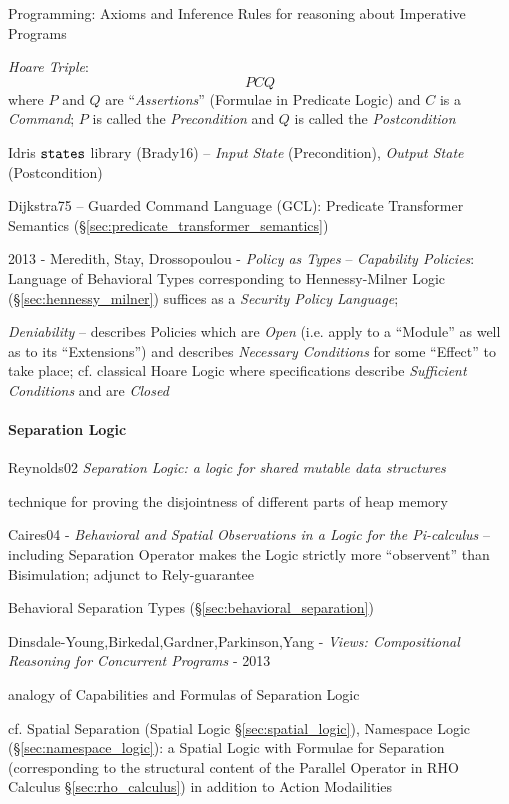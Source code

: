 Programming: Axioms and Inference Rules for reasoning about Imperative
Programs

\emph{Hoare Triple}:
\[
  {P} C {Q}
\]
where $P$ and $Q$ are ``\emph{Assertions}'' (Formulae in Predicate
Logic) and $C$ is a \emph{Command}; $P$ is called the
\emph{Precondition} and $Q$ is called the \emph{Postcondition}

Idris $\mathtt{states}$ library (Brady16) -- \emph{Input State}
(Precondition), \emph{Output State} (Postcondition)

Dijkstra75 -- Guarded Command Language (GCL): Predicate Transformer
Semantics (\S\ref{sec:predicate_transformer_semantics})

\asterism

2013 - Meredith, Stay, Drossopoulou - \emph{Policy as Types} --
\emph{Capability Policies}: Language of Behavioral Types corresponding to
Hennessy-Milner Logic (\S\ref{sec:hennessy_milner}) suffices as a \emph{Security
  Policy Language};

\emph{Deniability} --
describes Policies which are \emph{Open} (i.e. apply to a ``Module'' as well as
to its ``Extensions'') and describes \emph{Necessary Conditions} for some
``Effect'' to take place; cf. classical Hoare Logic where
specifications describe \emph{Sufficient Conditions} and are
  \emph{Closed}



\paragraph{Separation Logic}\label{sec:separation_logic}\hfill

Reynolds02 \emph{Separation Logic: a logic for shared mutable data
  structures}

technique for proving the disjointness of different parts of heap memory

Caires04 - \emph{Behavioral and Spatial Observations in a Logic for the
  Pi-calculus} -- including Separation Operator makes the Logic strictly more
``observent'' than Bisimulation; adjunct to Rely-guarantee

\fist Behavioral Separation Types (\S\ref{sec:behavioral_separation})

Dinsdale-Young,Birkedal,Gardner,Parkinson,Yang - \emph{Views: Compositional
Reasoning for Concurrent Programs} - 2013

analogy of Capabilities and Formulas of Separation Logic

cf. Spatial Separation (Spatial Logic \S\ref{sec:spatial_logic}), Namespace
Logic (\S\ref{sec:namespace_logic}): a Spatial Logic with Formulae for
Separation (corresponding to the structural content of the Parallel Operator in
RHO Calculus \S\ref{sec:rho_calculus}) in addition to Action Modailities

